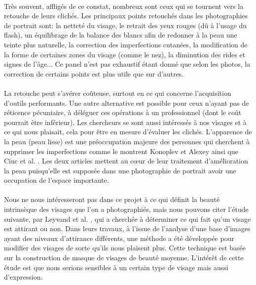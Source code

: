 \documentclass[11pt, french]{report-rd-info}
\begin{document}
\paragraph*{}
Très souvent, affligés de ce constat, nombreux sont ceux qui se tournent vers la retouche de leurs clichés. Les principaux points retouchés dans les photographies de portrait sont: la netteté du visage, le retrait des yeux rouges (dû à l'usage du flash), un équilibrage de la balance des blancs afin de redonner à la peau une teinte plus naturelle, la correction des imperfections cutanées, la modification de la forme de certaines zones du visage (comme le nez), la diminution des rides et signes de l'âge... Ce panel n'est pas exhaustif étant donné que selon les photos, la correction de certains points est plus utile que sur d'autres.
\paragraph*{}
La retouche peut s'avérer coûteuse, surtout en ce qui concerne l'acquisition d'outils performants. Une autre alternative est possible pour ceux n'ayant pas de réticence pécuniaire, à déléguer ces opérations à un professionnel (dont le coût pourrait être inférieur). Les chercheurs se sont aussi intéressés à nos visages et à ce qui nous plaisait, cela pour être en mesure d'évaluer les clichés. L’apparence de la peau (peau lisse) est une préoccupation majeure des personnes qui cherchent à supprimer les imperfections comme le montrent Konoplev et Alexey \cite{Konoplev2012} ainsi que Ciuc et al. \cite{Ciuc2010}. Les deux articles mettent au cœur de leur traitement d'amélioration la peau puisqu'elle est supposée dans une photographie de portrait avoir une occupation de l'espace importante.
\paragraph*{}
Nous ne nous intéresseront pas dans ce projet à ce qui définit la beauté intrinsèque des visages que l'on a photographiés, mais nous pouvons citer l'étude suivante, par Leyvand et al. \cite{Leyvand2008}, qui a cherchée à déterminer ce qui fait qu'un visage est attirant ou non. Dans leurs travaux, à l'issue de l'analyse d'une base d'images ayant des niveaux d'attirance différents,  une méthode a été développée pour modifier des visages de sorte qu'ils nous plaisent plus. Cette technique est basée sur la construction de masque de visages de beauté moyenne. L'intérêt de cette étude est que nous serions sensibles à un certain type de visage mais aussi d'expression.
\end{document}
